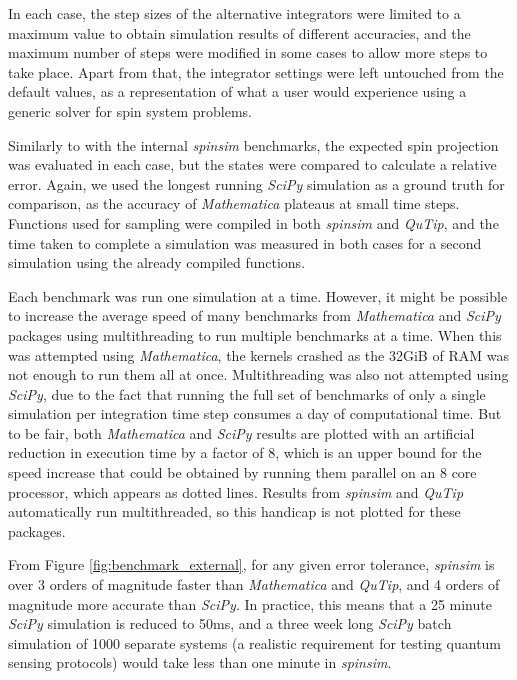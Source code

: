 \documentclass{jors}
\begin{document}
		In each case, the step sizes of the alternative integrators were limited to a maximum value to obtain simulation results of different accuracies, and the maximum number of steps were modified in some cases to allow more steps to take place.
		Apart from that, the integrator settings were left untouched from the default values, as a representation of what a user would experience using a generic solver for spin system problems.

		Similarly to with the internal \emph{spinsim} benchmarks, the expected spin projection was evaluated in each case, but the states were compared to calculate a relative error.
		Again, we used the longest running \emph{SciPy} simulation as a ground truth for comparison, as the accuracy of \emph{Mathematica} plateaus at small time steps.
		Functions used for sampling were compiled in both \emph{spinsim} and \emph{QuTip}, and the time taken to complete a simulation was measured in both cases for a second simulation using the already compiled functions.

		Each benchmark was run one simulation at a time.
		However, it might be possible to increase the average speed of many benchmarks from \emph{Mathematica} and \emph{SciPy} packages using multithreading to run multiple benchmarks at a time.
		When this was attempted using \emph{Mathematica}, the kernels crashed as the 32GiB of RAM was not enough to run them all at once.
		Multithreading was also not attempted using \emph{SciPy}, due to the fact that running the full set of benchmarks of only a single simulation per integration time step consumes a day of computational time.
		But to be fair, both \emph{Mathematica} and \emph{SciPy} results are plotted with an artificial reduction in execution time by a factor of 8, which is an upper bound for the speed increase that could be obtained by running them parallel on an 8 core processor, which appears as dotted lines.
		Results from \emph{spinsim} and \emph{QuTip} automatically run multithreaded, so this handicap is not plotted for these packages.

		From Figure \ref{fig:benchmark_external}, for any given error tolerance, \emph{spinsim} is over 3 orders of magnitude faster than \emph{Mathematica} and \emph{QuTip}, and 4 orders of magnitude more accurate than \emph{SciPy}.
		In practice, this means that a 25 minute \emph{SciPy} simulation is reduced to 50ms, and a three week long \emph{SciPy} batch simulation of 1000 separate systems (a realistic requirement for testing quantum sensing protocols) would take less than one minute in \emph{spinsim}.
\end{document}
